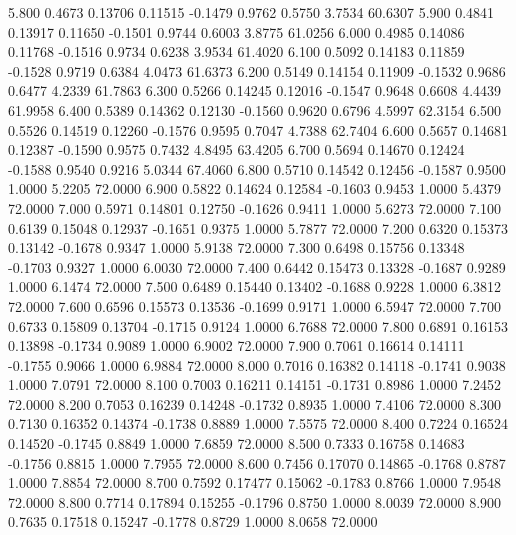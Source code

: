    5.800   0.4673   0.13706   0.11515  -0.1479   0.9762   0.5750   3.7534  60.6307
   5.900   0.4841   0.13917   0.11650  -0.1501   0.9744   0.6003   3.8775  61.0256
   6.000   0.4985   0.14086   0.11768  -0.1516   0.9734   0.6238   3.9534  61.4020
   6.100   0.5092   0.14183   0.11859  -0.1528   0.9719   0.6384   4.0473  61.6373
   6.200   0.5149   0.14154   0.11909  -0.1532   0.9686   0.6477   4.2339  61.7863
   6.300   0.5266   0.14245   0.12016  -0.1547   0.9648   0.6608   4.4439  61.9958
   6.400   0.5389   0.14362   0.12130  -0.1560   0.9620   0.6796   4.5997  62.3154
   6.500   0.5526   0.14519   0.12260  -0.1576   0.9595   0.7047   4.7388  62.7404
   6.600   0.5657   0.14681   0.12387  -0.1590   0.9575   0.7432   4.8495  63.4205
   6.700   0.5694   0.14670   0.12424  -0.1588   0.9540   0.9216   5.0344  67.4060
   6.800   0.5710   0.14542   0.12456  -0.1587   0.9500   1.0000   5.2205  72.0000
   6.900   0.5822   0.14624   0.12584  -0.1603   0.9453   1.0000   5.4379  72.0000
   7.000   0.5971   0.14801   0.12750  -0.1626   0.9411   1.0000   5.6273  72.0000
   7.100   0.6139   0.15048   0.12937  -0.1651   0.9375   1.0000   5.7877  72.0000
   7.200   0.6320   0.15373   0.13142  -0.1678   0.9347   1.0000   5.9138  72.0000
   7.300   0.6498   0.15756   0.13348  -0.1703   0.9327   1.0000   6.0030  72.0000
   7.400   0.6442   0.15473   0.13328  -0.1687   0.9289   1.0000   6.1474  72.0000
   7.500   0.6489   0.15440   0.13402  -0.1688   0.9228   1.0000   6.3812  72.0000
   7.600   0.6596   0.15573   0.13536  -0.1699   0.9171   1.0000   6.5947  72.0000
   7.700   0.6733   0.15809   0.13704  -0.1715   0.9124   1.0000   6.7688  72.0000
   7.800   0.6891   0.16153   0.13898  -0.1734   0.9089   1.0000   6.9002  72.0000
   7.900   0.7061   0.16614   0.14111  -0.1755   0.9066   1.0000   6.9884  72.0000
   8.000   0.7016   0.16382   0.14118  -0.1741   0.9038   1.0000   7.0791  72.0000
   8.100   0.7003   0.16211   0.14151  -0.1731   0.8986   1.0000   7.2452  72.0000
   8.200   0.7053   0.16239   0.14248  -0.1732   0.8935   1.0000   7.4106  72.0000
   8.300   0.7130   0.16352   0.14374  -0.1738   0.8889   1.0000   7.5575  72.0000
   8.400   0.7224   0.16524   0.14520  -0.1745   0.8849   1.0000   7.6859  72.0000
   8.500   0.7333   0.16758   0.14683  -0.1756   0.8815   1.0000   7.7955  72.0000
   8.600   0.7456   0.17070   0.14865  -0.1768   0.8787   1.0000   7.8854  72.0000
   8.700   0.7592   0.17477   0.15062  -0.1783   0.8766   1.0000   7.9548  72.0000
   8.800   0.7714   0.17894   0.15255  -0.1796   0.8750   1.0000   8.0039  72.0000
   8.900   0.7635   0.17518   0.15247  -0.1778   0.8729   1.0000   8.0658  72.0000
